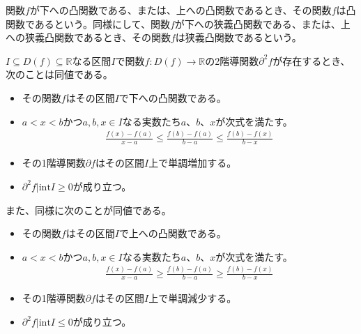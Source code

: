 \documentclass[dvipdfmx]{jsarticle}
\begin{document}
\begin{dfn}
関数$f$が下への凸関数である、または、上への凸関数であるとき、その関数$f$は凸関数であるという。同様にして、関数$f$が下への狭義凸関数である、または、上への狭義凸関数であるとき、その関数$f$は狭義凸関数であるという。
\end{dfn}
\begin{thm}\label{4.2.2.16}
$I \subseteq D(f) \subseteq \mathbb{R}$なる区間$I$で関数$f:D(f) \rightarrow \mathbb{R}$の2階導関数$\partial^{2}f$が存在するとき、次のことは同値である。
\begin{itemize}
\item
  その関数$f$はその区間$I$で下への凸関数である。
\item
  $a < x < b$かつ$a,b,x \in I$なる実数たち$a$、$b$、$x$が次式を満たす。
\begin{align*}
\frac{f(x) - f(a)}{x - a} \leq \frac{f(b) - f(a)}{b - a} \leq \frac{f(b) - f(x)}{b - x}
\end{align*}
\item
  その1階導関数$\partial f$はその区間$I$上で単調増加する。
\item
  $\partial^{2}f|\mathrm{int}I \geq 0$が成り立つ。
\end{itemize}
また、同様に次のことが同値である。
\begin{itemize}
\item
  その関数$f$はその区間$I$で上への凸関数である。
\item
  $a < x < b$かつ$a,b,x \in I$なる実数たち$a$、$b$、$x$が次式を満たす。
\begin{align*}
\frac{f(x) - f(a)}{x - a} \geq \frac{f(b) - f(a)}{b - a} \geq \frac{f(b) - f(x)}{b - x}
\end{align*}
\item
  その1階導関数$\partial f$はその区間$I$上で単調減少する。
\item
  $\partial^{2}f|\mathrm{int}I \leq 0$が成り立つ。
\end{itemize}
\end{thm}
\end{document}
